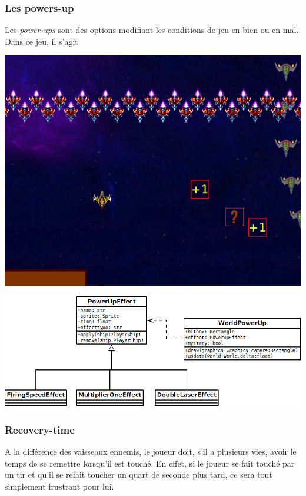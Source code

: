 \documentclass{article}
\begin{document}
\subsubsection{Les powers-up}

Les \emph{power-ups} sont des options modifiant les conditions de jeu en bien ou
en mal. Dans ce jeu, il s'agit

\begin{center}
\includegraphics[scale= 0.8]{images/exemple_powerup.png}
\end{center}

\begin{center}
\includegraphics[scale= 0.8]{images/dia_powerup.png}
\end{center}




\subsubsection{Recovery-time}

A la différence des vaisseaux ennemis, le joueur doit, s'il a plusieurs vies,
avoir le temps de se remettre lorsqu'il est touché. En effet, si le joueur se
fait touché par un tir et qu'il se refait toucher un quart de seconde plus tard,
ce sera tout simplement frustrant pour lui. \newline
\end{document}
